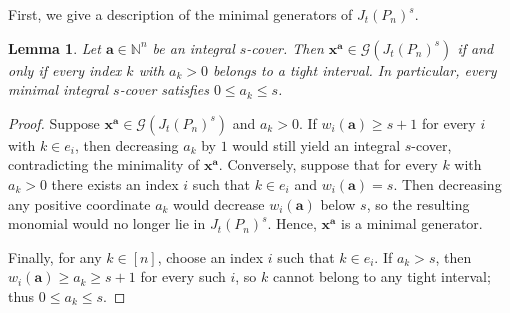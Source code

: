 \documentclass[12pt]{amsart}
\newtheorem{lemma}[theorem]{Lemma}
\theoremstyle{definition}
\theoremstyle{remark}
\numberwithin{equation}{section}
\begin{document}
First, we give a description of the minimal generators of $J_t(P_n)^s$.

\begin{lemma}\label{lem:minimality}
Let $\mathbf{a} \in \mathbb{N}^n$ be an integral $s$-cover. Then $\mathbf{x}^{\mathbf{a}} \in \mathcal{G}(J_t(P_n)^s)$ if and only if every index $k$ with $a_k > 0$ belongs to a tight interval. In particular, every minimal integral $s$-cover satisfies $0 \le a_k \le s$.
\end{lemma}

\begin{proof}
Suppose $\mathbf{x}^{\mathbf{a}} \in \mathcal{G}(J_t(P_n)^s)$ and $a_k > 0$. If $w_i(\mathbf{a}) \ge s+1$ for every $i$ with $k \in e_i$, then decreasing $a_k$ by $1$ would still yield an integral $s$-cover, contradicting the minimality of $\mathbf{x}^{\mathbf{a}}$. Conversely, suppose that for every $k$ with $a_k > 0$ there exists an index $i$ such that $k \in e_i$ and $w_i(\mathbf{a}) = s$. Then decreasing any positive coordinate $a_k$ would decrease $w_i(\mathbf{a})$ below $s$, so the resulting monomial would no longer lie in $J_t(P_n)^s$. Hence, $\mathbf{x}^{\mathbf{a}}$ is a minimal generator. 

Finally, for any $k \in [n]$, choose an index $i$ such that $k \in e_i$. If $a_k > s$, then $w_i(\mathbf{a}) \ge a_k \ge s+1$ for every such $i$, so $k$ cannot belong to any tight interval; thus $0 \le a_k \le s$.
\end{proof}
\end{document}
